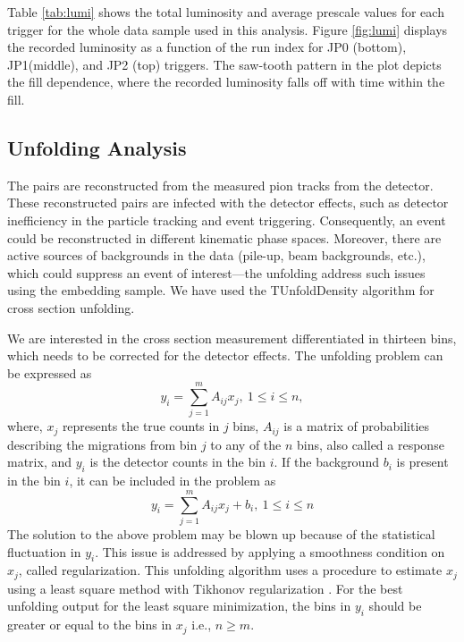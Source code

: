 Table \ref{tab:lumi} shows the total luminosity and average prescale values for each trigger for the whole data sample used in this analysis. Figure \ref{fig:lumi} displays the recorded luminosity as a function of the run index for JP0 (bottom), JP1(middle), and JP2 (top) triggers. The saw-tooth pattern in the plot depicts the fill dependence, where the recorded luminosity falls off with time within the fill.   
  
\subsection{Unfolding Analysis}
\label{sec:unfolding}
The \dipion pairs are reconstructed from the measured pion tracks from the detector. These reconstructed \dipion pairs are infected with the detector effects, such as detector inefficiency in the particle tracking and event triggering. Consequently, an event could be reconstructed in different kinematic phase spaces. Moreover, there are active sources of backgrounds in the data (pile-up, beam backgrounds, etc.), which could suppress an event of interest—the unfolding address such issues using the embedding sample. We have used the TUnfoldDensity algorithm\cite{Schmitt:2012} for cross section unfolding.

We are  interested in the \dipion cross section measurement differentiated in thirteen \minv bins, which needs to be corrected for the detector effects. The unfolding problem can be expressed as 
\begin{equation}
        \label{eq:uf1}
        y_i = \sum_{j=1}^m A_{ij}x_j, \ 1\leq i \leq n ,
\end{equation}
where, $x_j$ represents the true counts in $j$ bins, $A_{ij}$ is a matrix of probabilities describing the migrations from bin $j$ to any of the $n$ bins, also called a response matrix, and $y_i$ is the detector counts in the bin $i$. If the background $b_i$ is present in the bin $i$, it can be included in the problem as 
\begin{equation}
        \label{eq:uf2}
        y_i = \sum_{j=1}^m A_{ij}x_j + b_i, \ 1\leq i \leq n 
\end{equation}
The solution to the above problem may be blown up because of the statistical fluctuation in $y_i$. This issue is addressed by applying a smoothness condition on $x_j$, called regularization. This unfolding algorithm uses a procedure to estimate $x_j$ using a least square method with Tikhonov regularization \cite{Tikhonov:1963}. For the best unfolding output for the least square minimization, the bins in $y_i$ should be greater or equal to the bins in $x_j$ i.e., $n\geq m$.


